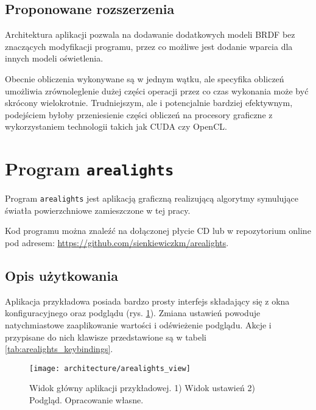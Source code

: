 \documentclass[../main.tex]{subfiles}
\begin{document}
\subsection{Proponowane rozszerzenia}

Architektura aplikacji pozwala na dodawanie dodatkowych modeli BRDF bez znaczących modyfikacji programu, przez co możliwe jest dodanie wparcia dla innych modeli oświetlenia.

Obecnie obliczenia wykonywane są w jednym wątku, ale specyfika obliczeń umożliwia zrównoleglenie dużej części operacji przez co czas wykonania może być skrócony wielokrotnie. Trudniejszym, ale i potencjalnie bardziej efektywnym, podejściem byłoby przeniesienie części obliczeń na procesory graficzne z wykorzystaniem technologii takich jak CUDA czy OpenCL.

\section{Program \texttt{arealights}}

Program \texttt{arealights} jest aplikacją graficzną realizującą algorytmy symulujące światła powierzchniowe zamieszczone w tej pracy.

Kod programu można znaleźć na dołączonej płycie CD lub w repozytorium online pod adresem: \url{https://github.com/sienkiewiczkm/arealights}.

\subsection{Opis użytkowania}

Aplikacja przykładowa posiada bardzo prosty interfejs składający się z okna konfiguracyjnego oraz podglądu (rys. \ref{fig:app_arealights_view}). Zmiana ustawień powoduje natychmiastowe zaaplikowanie wartości i odświeżenie podglądu. Akcje i przypisane do nich klawisze przedstawione są w tabeli \ref{tab:arealights_keybindings}.

\begin{figure}[h]
    \centering
    \texttt{[image: architecture/arealights\_view]}
    \caption{Widok główny aplikacji przykładowej. 1) Widok ustawień 2) Podgląd. Opracowanie własne.}
    \label{fig:app_arealights_view}
\end{figure}
\end{document}
